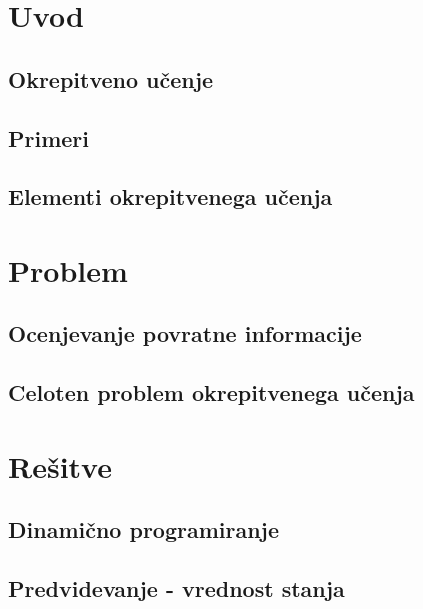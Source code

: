 \documentclass[a4paper, oneside, 12pt]{article}
\begin{document}
\listoffigures
\newpage



\section{Uvod}
\subsection{Okrepitveno učenje}
\subsection{Primeri}
\subsection{Elementi okrepitvenega učenja}
\newpage

\section{Problem}
\subsection{Ocenjevanje povratne informacije}
\subsection{Celoten problem okrepitvenega učenja}
\newpage

\section{Rešitve}
\subsection{Dinamično programiranje}
\subsection{Predvidevanje - vrednost stanja}
\end{document}
